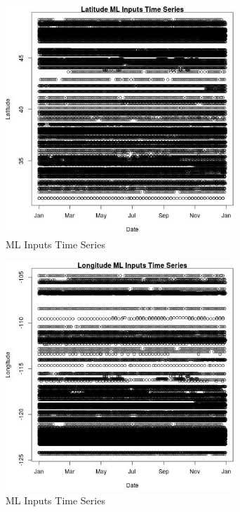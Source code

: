 \begin{figure} 
\centering  
\includegraphics[width=0.77\textwidth]{Code_Outputs/Report_ML_input_PM25_Step4_part_e_de_duplicated_aves_LatitudevDate.jpg} 
\caption{\label{fig:Report_ML_input_PM25_Step4_part_e_de_duplicated_avesLatitudevDate}ML Inputs Time Series} 
\end{figure} 
 

\begin{figure} 
\centering  
\includegraphics[width=0.77\textwidth]{Code_Outputs/Report_ML_input_PM25_Step4_part_e_de_duplicated_aves_LongitudevDate.jpg} 
\caption{\label{fig:Report_ML_input_PM25_Step4_part_e_de_duplicated_avesLongitudevDate}ML Inputs Time Series} 
\end{figure} 
 

